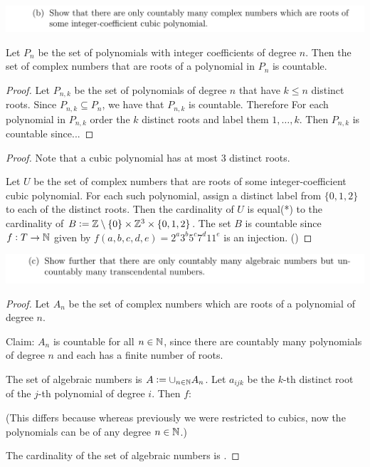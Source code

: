 \documentclass[12pt]{article}
\begin{document}
\begin{mdframed}
  \includegraphics[width=400pt]{img/oxford-M2-analysis-I-2-8-b.png}
\end{mdframed}

\begin{lemma*}
  Let $P_n$ be the set of polynomials with integer coefficients of degree $n$. Then the set of
  complex numbers that are roots of a polynomial in $P_n$ is countable.
\end{lemma*}
\begin{proof}
  Let $P_{n,k}$ be the set of polynomials of degree $n$ that have $k \leq n$ distinct roots. Since
  $P_{n,k} \subseteq P_n$, we have that $P_{n,k}$ is countable. Therefore For each polynomial in
  $P_{n,k}$ order the $k$ distinct roots and label them $1, \ldots, k$. Then $P_{n,k}$ is countable
  since...
\end{proof}

\begin{proof}
  Note that a cubic polynomial has at most 3 distinct roots.

  Let $U$ be the set of complex numbers that are roots of some integer-coefficient cubic
  polynomial. For each such polynomial, assign a distinct label from $\{0, 1, 2\}$ to each of the
  distinct roots. Then the cardinality of $U$ is equal(*) to the cardinality of
  $B := \mathbb{Z}\setminus\{0\} \times \mathbb{Z}^3 \times \{0, 1, 2\}$. The set $B$ is countable since
  $f:T \to \mathbb{N}$ given by $f(a, b, c, d, e) = 2^a3^b5^c7^d11^e$ is an injection. ()
\end{proof}

\begin{mdframed}
  \includegraphics[width=400pt]{img/oxford-M2-analysis-I-2-8-c.png}
\end{mdframed}

\begin{proof}
  Let $A_n$ be the set of complex numbers which are roots of a polynomial of degree $n$.

  Claim: $A_n$ is countable for all $n \in \mathbb{N}$, since there are countably many polynomials of
  degree $n$ and each has a finite number of roots.

  The set of algebraic numbers is $A := \cup_{n\in\mathbb{N}} A_n$. Let $a_{ijk}$ be the $k$-th distinct
  root of the $j$-th polynomial of degree $i$. Then $f:$

  (This differs because whereas previously we were restricted to cubics, now the polynomials can
  be of any degree $n \in \mathbb{N}$.)

  The cardinality of the set of algebraic numbers is .
\end{proof}
\newpage
\end{document}
